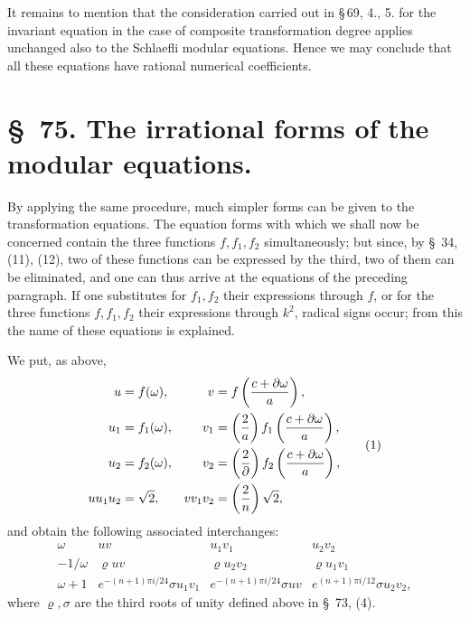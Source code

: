 \documentclass[11pt]{article}
\begin{document}
It remains to mention that the consideration carried out in \S\,69, 4., 5. for the invariant equation in the case of composite transformation degree applies unchanged also to the Schlaefli modular equations. Hence we may conclude that all these equations have rational numerical coefficients.

\clearpage

\section*{\S~75. The irrational forms of the modular equations.}

By applying the same procedure, much simpler forms can be given to the transformation equations. The equation forms with which we shall now be concerned contain the three functions $f,f_1,f_2$ simultaneously; but since, by \S~34, (11), (12), two of these functions can be expressed by the third, two of them can be eliminated, and one can thus arrive at the equations of the preceding paragraph. If one substitutes for $f_1,f_2$ their expressions through $f$, or for the three functions $f,f_1,f_2$ their expressions through $k^2$, radical signs occur; from this the name of these equations is explained.

We put, as above,
\begin{equation}
\begin{aligned}
u&=f(\omega),& v&=f\left({c+\partial\omega\over a}\right),\\
u_1&=f_1(\omega),& v_1&=\left({2\over a}\right)f_1\left({c+\partial\omega\over a}\right),\\
u_2&=f_2(\omega),& v_2&=\left({2\over\partial}\right)f_2\left({c+\partial\omega\over a}\right),\\
u u_1u_2&=\sqrt2,& vv_1v_2&=\left({2\over n}\right)\sqrt2,
\end{aligned}
\tag{1}
\end{equation}
and obtain the following associated interchanges:
\begin{equation}
\begin{array}{c|ccc}
\omega&uv&u_1v_1&u_2v_2\\[0.2em]
-1/\omega&\varrho uv&\varrho u_2v_2&\varrho u_1v_1\\[0.2em]
\omega+1&e^{-(n+1)\pi i/24}\sigma u_1v_1&e^{-(n+1)\pi i/24}\sigma uv&e^{(n+1)\pi i/12}\sigma u_2v_2,
\end{array}
\tag{2}
\end{equation}
where $\varrho,\sigma$ are the third roots of unity defined above in \S~73, (4).
\end{document}
